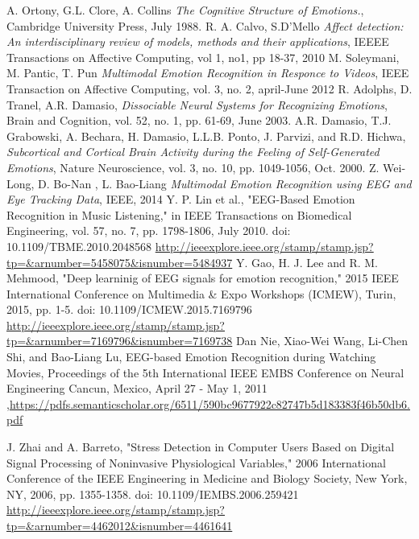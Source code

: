 \documentclass[10pt,journal,compsoc,twoside]{IEEEtran}
\begin{document}
\begin{thebibliography}{99}
A. Ortony, G.L. Clore, A. Collins \textit{The Cognitive Structure of Emotions.}, Cambridge University Press, July 1988.
 R. A. Calvo, S.D'Mello \textit{Affect detection: An interdisciplinary review of models, methods and their applications}, IEEEE Transactions on Affective Computing, vol 1, no1, pp 18-37, 2010
 M. Soleymani, M. Pantic, T. Pun \textit{Multimodal Emotion Recognition in Responce to Videos}, IEEE Transaction on Affective Computing, vol. 3, no. 2, april-June 2012
R. Adolphs, D. Tranel, A.R. Damasio, \textit{Dissociable Neural Systems for Recognizing Emotions}, Brain and Cognition, vol. 52, no. 1, pp. 61-69, June 2003.
 A.R. Damasio, T.J. Grabowski, A. Bechara, H. Damasio, L.L.B.
Ponto, J. Parvizi, and R.D. Hichwa, \textit{Subcortical and Cortical Brain
Activity during the Feeling of Self-Generated Emotions}, Nature
Neuroscience, vol. 3, no. 10, pp. 1049-1056, Oct. 2000.
 Z. Wei-Long, D. Bo-Nan , L. Bao-Liang 
\textit{Multimodal Emotion Recognition using EEG and Eye Tracking Data}, IEEE, 2014
Y. P. Lin et al., "EEG-Based Emotion Recognition in Music Listening," in IEEE Transactions on Biomedical Engineering, vol. 57, no. 7, pp. 1798-1806, July 2010.
doi: 10.1109/TBME.2010.2048568
\url{http://ieeexplore.ieee.org/stamp/stamp.jsp?tp=&arnumber=5458075&isnumber=5484937}
Y. Gao, H. J. Lee and R. M. Mehmood, "Deep learninig of EEG signals for emotion recognition," 2015 IEEE International Conference on Multimedia \& Expo Workshops (ICMEW), Turin, 2015, pp. 1-5.
doi: 10.1109/ICMEW.2015.7169796
\url{http://ieeexplore.ieee.org/stamp/stamp.jsp?tp=&arnumber=7169796&isnumber=7169738}
Dan Nie, Xiao-Wei Wang, Li-Chen Shi, and Bao-Liang Lu, EEG-based Emotion Recognition during Watching Movies, Proceedings of the 5th International IEEE EMBS Conference on Neural Engineering Cancun, Mexico, April 27 - May 1, 2011 ,\url{https://pdfs.semanticscholar.org/6511/590bc9677922c82747b5d183383f46b50db6.pdf}

J. Zhai and A. Barreto, "Stress Detection in Computer Users Based on Digital Signal Processing of Noninvasive Physiological Variables," 2006 International Conference of the IEEE Engineering in Medicine and Biology Society, New York, NY, 2006, pp. 1355-1358.
doi: 10.1109/IEMBS.2006.259421
\url{ http://ieeexplore.ieee.org/stamp/stamp.jsp?tp=&arnumber=4462012&isnumber=4461641}


\end{thebibliography}
\end{document}
